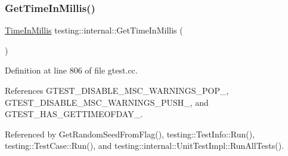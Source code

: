 \subsubsection{\texorpdfstring{Get\+Time\+In\+Millis()}{GetTimeInMillis()}}
{\footnotesize\ttfamily \hyperlink{namespacetesting_1_1internal_a66a845df404b38fe85c5e14a069f255a}{Time\+In\+Millis} testing\+::internal\+::\+Get\+Time\+In\+Millis (\begin{DoxyParamCaption}{ }\end{DoxyParamCaption})}



Definition at line 806 of file gtest.\+cc.



References G\+T\+E\+S\+T\+\_\+\+D\+I\+S\+A\+B\+L\+E\+\_\+\+M\+S\+C\+\_\+\+W\+A\+R\+N\+I\+N\+G\+S\+\_\+\+P\+O\+P\+\_\+, G\+T\+E\+S\+T\+\_\+\+D\+I\+S\+A\+B\+L\+E\+\_\+\+M\+S\+C\+\_\+\+W\+A\+R\+N\+I\+N\+G\+S\+\_\+\+P\+U\+S\+H\+\_\+, and G\+T\+E\+S\+T\+\_\+\+H\+A\+S\+\_\+\+G\+E\+T\+T\+I\+M\+E\+O\+F\+D\+A\+Y\+\_\+.



Referenced by Get\+Random\+Seed\+From\+Flag(), testing\+::\+Test\+Info\+::\+Run(), testing\+::\+Test\+Case\+::\+Run(), and testing\+::internal\+::\+Unit\+Test\+Impl\+::\+Run\+All\+Tests().


